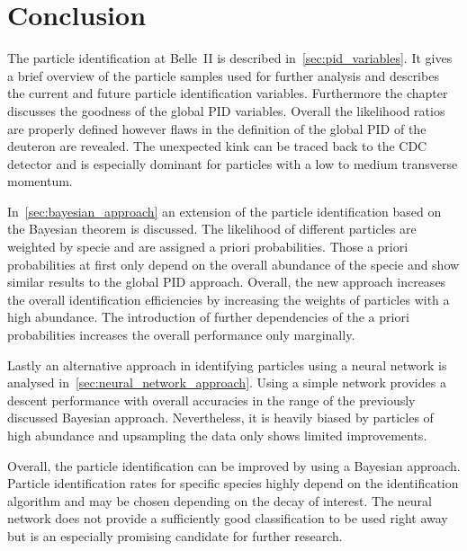 \chapter{Conclusion}
\label{chap:conclusion}

The particle identification at Belle~\RN{2} is described in~\autoref{sec:pid_variables}. It gives a brief overview of the particle samples used for further analysis and describes the current and future particle identification variables. Furthermore the chapter discusses the goodness of the global PID variables. Overall the likelihood ratios are properly defined however flaws in the definition of the global PID of the deuteron are revealed. The unexpected kink can be traced back to the CDC detector and is especially dominant for particles with a low to medium transverse momentum.

In~\autoref{sec:bayesian_approach} an extension of the particle identification based on the Bayesian theorem is discussed. The likelihood of different particles are weighted by specie and are assigned a priori probabilities. Those a priori probabilities at first only depend on the overall abundance of the specie and show similar results to the global PID approach. Overall, the new approach increases the overall identification efficiencies by increasing the weights of particles with a high abundance. The introduction of further dependencies of the a priori probabilities increases the overall performance only marginally.

Lastly an alternative approach in identifying particles using a neural network is analysed in~\autoref{sec:neural_network_approach}. Using a simple network provides a descent performance with overall accuracies in the range of the previously discussed Bayesian approach. Nevertheless, it is heavily biased by particles of high abundance and upsampling the data only shows limited improvements.

Overall, the particle identification can be improved by using a Bayesian approach. Particle identification rates for specific species highly depend on the identification algorithm and may be chosen depending on the decay of interest. The neural network does not provide a sufficiently good classification to be used right away but is an especially promising candidate for further research.
